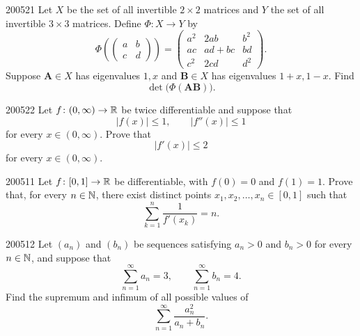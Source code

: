 \begin{problem}{2005}{2}{1}
Let $X$ be the set of all invertible $2\times2$ matrices and $Y$ the set of all invertible $3\times3$ matrices. Define $\Phi\colon X\to Y$ by
\[
    \Phi\left(
    \begin{pmatrix}
        a&b\\
        c&d
    \end{pmatrix}
    \right)
    =
    \begin{pmatrix}
        a^2&2ab&b^2\\
        ac&ad+bc&bd\\
        c^2&2cd&d^2
    \end{pmatrix}.
\]
Suppose $\mathbf A\in X$ has eigenvalues $1, x$ and $\mathbf B\in X$ has eigenvalues $1+x, 1-x$. Find
\[
    \det\bigl(\Phi(\mathbf A\mathbf B)\bigr).
\]
\end{problem}

\begin{problem}{2005}{2}{2}
Let $f\colon(0, \infty)\to\mathbb{R}$ be twice differentiable and suppose that
\[
    |f(x)|\le1,
    \qquad
    |f''(x)|\le1
\]
for every $x\in(0, \infty)$. Prove that
\[
    |f'(x)|\le2
\]
for every $x\in(0, \infty)$.
\end{problem}

\begin{problem}{2005}{1}{1}
Let $f\colon[0, 1]\to\mathbb{R}$ be differentiable, with $f(0)=0$ and $f(1)=1$. Prove that, for every $n\in\mathbb{N}$, there exist distinct points $x_1, x_2, \dots, x_n\in[0, 1]$ such that
\[
    \sum_{k=1}^{n}\frac1{f'(x_k)}=n.
\]
\end{problem}

\begin{problem}{2005}{1}{2}
Let $(a_n)$ and $(b_n)$ be sequences satisfying $a_n>0$ and $b_n>0$ for every $n\in\mathbb{N}$, and suppose that
\[
    \sum_{n=1}^{\infty}a_n=3,
    \qquad
    \sum_{n=1}^{\infty}b_n=4.
\]
Find the supremum and infimum of all possible values of
\[
    \sum_{n=1}^{\infty}\frac{a_n^2}{a_n+b_n}.
\]
\end{problem}
